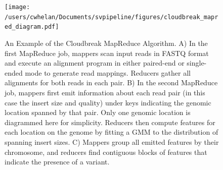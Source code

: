 \begin{figure}
\centering
\texttt{[image: /users/cwhelan/Documents/svpipeline/figures/cloudbreak\_mapred\_diagram.pdf]}
\caption{An Example of the Cloudbreak MapReduce Algorithm. A) In the first MapReduce job, mappers scan input reads in FASTQ format and execute an alignment program in either paired-end or single-ended mode to generate read mappings. Reducers gather all alignments for both reads in each pair. B) In the second MapReduce job, mappers first emit information about each read pair (in this case the insert size and quality) under keys indicating the genomic location spanned by that pair. Only one genomic location is diagrammed here for simplicity. Reducers then compute features for each location on the genome by fitting a GMM to the distribution of spanning insert sizes. C) Mappers group all emitted features by their chromosome, and reducers find contiguous blocks of features that indicate the presence of a variant.}
\label{cloudbreak_example}
\end{figure}

